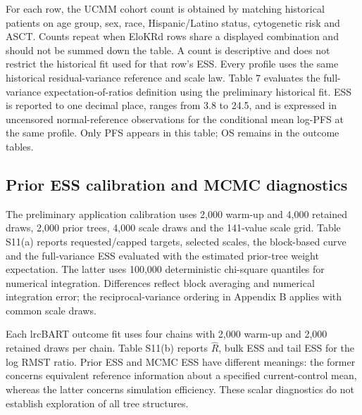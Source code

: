 For each row, the UCMM cohort count is obtained by matching historical patients on age group, sex, race, Hispanic/Latino status, cytogenetic risk and ASCT. Counts repeat when EloKRd rows share a displayed combination and should not be summed down the table. A count is descriptive and does not restrict the historical fit used for that row's ESS. Every profile uses the same historical residual-variance reference and scale law. Table 7 evaluates the full-variance expectation-of-ratios definition using the preliminary historical fit. ESS is reported to one decimal place, ranges from 3.8 to 24.5, and is expressed in uncensored normal-reference observations for the conditional mean log-PFS at the same profile. Only PFS appears in this table; OS remains in the outcome tables.

\subsection{Prior ESS calibration and MCMC diagnostics}\label{sec:F.4}
The preliminary application calibration uses 2,000 warm-up and 4,000 retained draws, 2,000 prior trees, 4,000 scale draws and the 141-value scale grid. Table S11(a) reports requested/capped targets, selected scales, the block-based curve and the full-variance ESS evaluated with the estimated prior-tree weight expectation. The latter uses 100,000 deterministic chi-square quantiles for numerical integration. Differences reflect block averaging and numerical integration error; the reciprocal-variance ordering in Appendix B applies with common scale draws.

Each lrcBART outcome fit uses four chains with 2,000 warm-up and 2,000 retained draws per chain. Table S11(b) reports $\widehat R$, bulk ESS and tail ESS for the log RMST ratio. Prior ESS and MCMC ESS have different meanings: the former concerns equivalent reference information about a specified current-control mean, whereas the latter concerns simulation efficiency. These scalar diagnostics do not establish exploration of all tree structures.
\renewcommand{\thetable}{S11(a)}

\clearpage
\renewcommand{\thetable}{S11(b)}

\renewcommand{\thetable}{S\arabic{table}}
\clearpage
